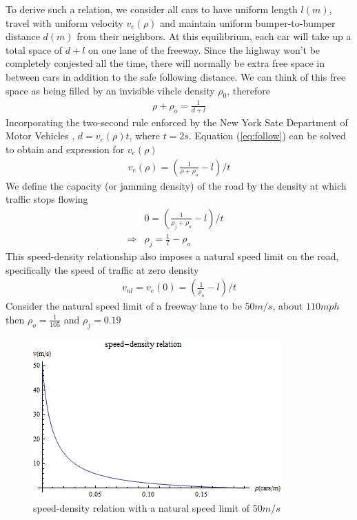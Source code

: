 	To derive such a relation, we consider all cars to have uniform length $l(m)$, travel with uniform velocity $v_e(\rho)$ and maintain uniform bumper-to-bumper distance $d(m)$ from their neighbors. At this equilibrium, each car will take up a total space of $d+l$ on one lane of the freeway. Since the highway won't be completely conjested all the time, there will normally be extra free space in between cars in addition to the safe following distance. We can think of this free space as being filled by an invisible vihcle density $\rho_0$, therefore
	\begin{align}
	& \rho + \rho_o= \frac{1}{d+l} & \label{eq:follow}
	\end{align}
	Incorporating the two-second rule enforced by the New York Sate Department of Motor Vehicles \cite{science_writing}, $d=v_e(\rho)t$, where $t=2s$. Equation (\ref{eq:follow}) can be solved to obtain and expression for $v_e(\rho)$
	\begin{align}
	& v_e(\rho) =  (\frac{1}{\rho+\rho_o}-l)/t& 
	\end{align}
	We define the capacity (or jamming density) of the road by the density at which traffic stops flowing
	\begin{align}
	& 0 =  (\frac{1}{\rho_j+\rho_o}-l)/t & \\
	\Rightarrow & \rho_j=\frac{1}{l}-\rho_o &
	\end{align}
	This speed-density relationship also imposes a natural speed limit on the road, specifically the speed of traffic at zero density
	\begin{align}
	& v_{nl} = v_e(0) =  (\frac{1}{\rho_o}-l)/t &
	\end{align}
	Consider the natural speed limit of a freeway lane to be $50m/s$, about $110mph$ then $\rho_o=\frac{1}{105}$ and $\rho_j=0.19$
	\begin{figure}[h]
	\includegraphics[scale=.6]{plot/speed_density}
	\caption{speed-density relation with a natural speed limit of $50m/s$}
	\end{figure}
	
